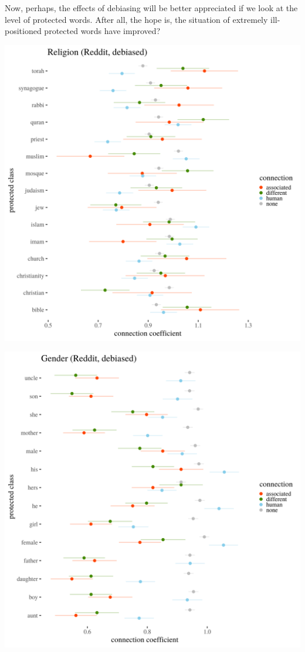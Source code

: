 \documentclass[
  12pt,
]{book}
\begin{document}
Now, perhaps, the effects of debiasing will be better appreciated if we look at the level of protected words. After all, the hope is, the situation of extremely ill-positioned protected words have improved?

\includegraphics[width=14cm]{../images/visDebReligionReddit.png}

\includegraphics[width=14cm]{../images/visDebGenderReddit.png}
\end{document}

